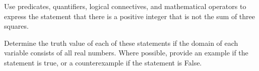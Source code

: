 \documentclass[a4paper]{exam}
\begin{document}
\begin{questions}
  
  \question Use predicates, quantifiers, logical connectives, and mathematical operators to express the statement that there is a positive integer that is not the sum of three squares.
    \begin{solution}
    \end{solution}

  \question Determine the truth value of each of these statements if the domain of each variable consists of all real numbers. Where possible, provide an example if the statement is true, or a counterexample if the statement is False.
\end{questions}
\end{document}
